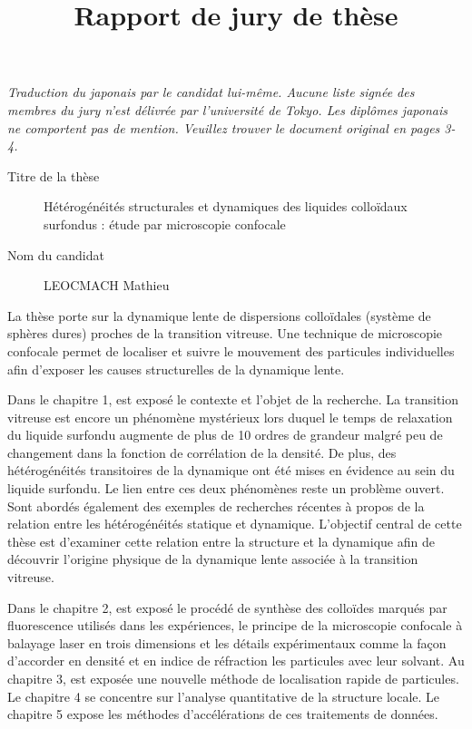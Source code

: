 \documentclass[10pt,a4paper]{article}
\title{Rapport de jury de thèse}
\date{}
\begin{document}
\maketitle
\textit{Traduction du japonais par le candidat lui-même. Aucune liste signée des membres du jury n'est délivrée par l'université de Tokyo. Les diplômes japonais ne comportent pas de mention. Veuillez trouver le document original en pages 3-4.}

\bigskip

\begin{description}
\item[Titre de la thèse] Hétérogénéités structurales et dynamiques des liquides colloïdaux surfondus : étude par microscopie confocale
\item[Nom du candidat] LEOCMACH Mathieu
\end{description}

\bigskip

La thèse porte sur la dynamique lente de dispersions colloïdales (système de sphères dures) proches de la transition vitreuse. Une technique de microscopie confocale permet de localiser et suivre le mouvement des particules individuelles afin d'exposer les causes structurelles de la dynamique lente.

\bigskip

Dans le chapitre 1, est exposé le contexte et l'objet de la recherche. La transition vitreuse est encore un phénomène mystérieux lors duquel le temps de relaxation du liquide surfondu augmente de plus de 10 ordres de grandeur malgré peu de changement dans la fonction de corrélation de la densité. De plus, des hétérogénéités transitoires de la dynamique ont été mises en évidence au sein du liquide surfondu. Le lien entre ces deux phénomènes reste un problème ouvert.
Sont abordés également des exemples de recherches récentes à propos de la relation entre les hétérogénéités statique et dynamique. L'objectif central de cette thèse est d'examiner cette relation entre la structure et la dynamique afin de découvrir l'origine physique de la dynamique lente associée à la transition vitreuse.

Dans le chapitre 2, est exposé le procédé de synthèse des colloïdes marqués par fluorescence utilisés dans les expériences, le principe de la microscopie confocale à balayage laser en trois dimensions et les détails expérimentaux comme la façon d'accorder en densité et en indice de réfraction les particules avec leur solvant. Au chapitre 3, est exposée une nouvelle méthode de localisation rapide de particules. Le chapitre 4 se concentre sur l'analyse quantitative de la structure locale. Le chapitre 5 expose les méthodes d'accélérations de ces traitements de données.
\end{document}
